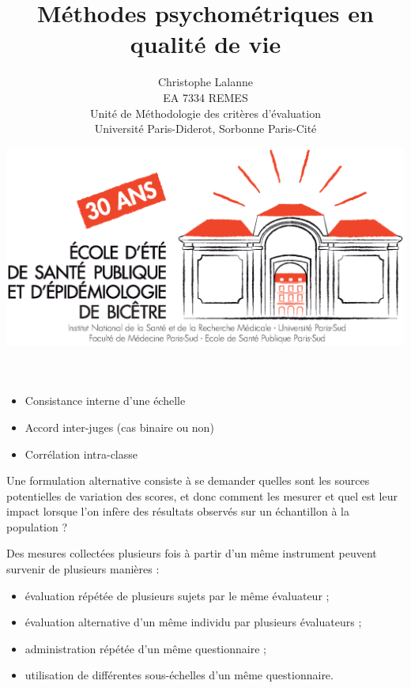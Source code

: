 

\title{Méthodes psychométriques en qualité de vie}
\author{Christophe Lalanne\\EA 7334 REMES\\ Unité de Méthodologie des critères d’évaluation\\Université Paris-Diderot, Sorbonne Paris-Cité\\}
\date{\includegraphics[height=18ex]{logo.eps}}




\LogoOff
\maketitle
\rightfooter{\quad\textsf{\thepage}}



\begin{itemize}
\item Consistance interne d'une échelle
\item Accord inter-juges (cas binaire ou non)
\item Corrélation intra-classe
\end{itemize}




Une formulation alternative consiste à se demander quelles sont les sources
potentielles de variation des scores, et donc comment les mesurer et quel est
leur impact lorsque l'on infère des résultats observés sur un échantillon à la
population ?

Des mesures collectées plusieurs fois à partir d'un même instrument peuvent
survenir de plusieurs manières\autocite{Dunn2000} :
\begin{itemize}
\item évaluation répétée de plusieurs sujets par le même évaluateur ;
\item évaluation alternative d'un même individu par plusieurs évaluateurs ;
\item administration répétée d'un même questionnaire ; 
\item utilisation de différentes sous-échelles d'un même questionnaire.
\end{itemize}

